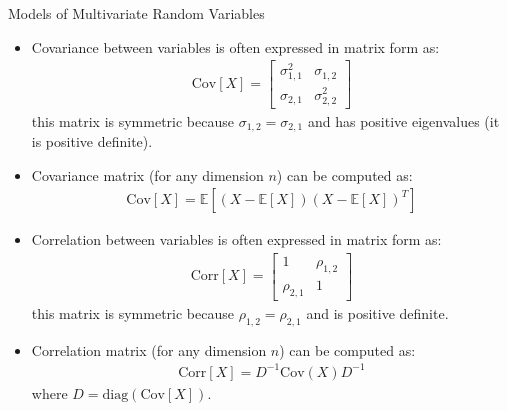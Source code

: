 \documentclass[9pt]{beamer}
\begin{document}
%
\begin{frame}{Models of Multivariate Random Variables}

\begin{itemize}
\item Covariance between variables is often expressed in matrix form as: 
\begin{align*}
\textrm{Cov}[X]=\left[\begin{array}{cc}\sigma_{1,1}^2&\sigma_{1,2}\\ \sigma_{2,1}&\sigma_{2,2}^2\end{array}\right]
\end{align*}
this matrix is symmetric because $\sigma_{1,2}=\sigma_{2,1}$ and has positive eigenvalues (it is positive definite).  

\item Covariance matrix (for any dimension $n$) can be computed as:
\begin{align*}
\textrm{Cov}[X]=\mathbb{E}\left[(X-\mathbb{E}[X])(X-\mathbb{E}[X])^T\right]
\end{align*}

\item Correlation between variables is often expressed in matrix form as: 
\begin{align*}
\textrm{Corr}[X]=\left[\begin{array}{cc}1&\rho_{1,2}\\ \rho_{2,1}&1\end{array}\right]
\end{align*}
this matrix is symmetric because $\rho_{1,2}=\rho_{2,1}$ and is positive definite.  

\item Correlation matrix (for any dimension $n$) can be computed as:
\begin{align*}
\textrm{Corr}[X]=D^{-1}\textrm{Cov}(X) D^{-1}
\end{align*}
where $D=\textrm{diag}(\textrm{Cov}[X])$. 
\end{itemize}

\end{frame}
\end{document}
